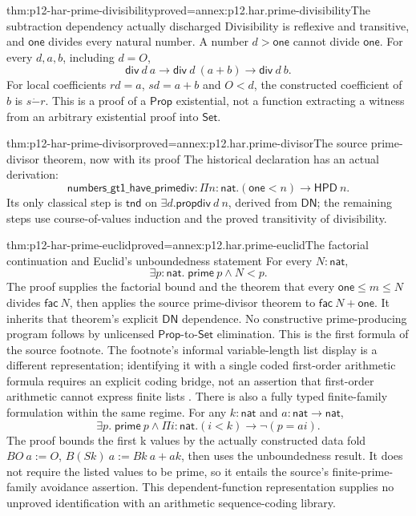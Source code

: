 \begin{hblemma}{thm:p12-har-prime-divisibility}{proved=annex:p12.har.prime-divisibility}{The subtraction dependency actually discharged}
Divisibility is reflexive and transitive, and \(\mathsf{one}\) divides
every natural number. A number \(d>\mathsf{one}\) cannot divide
\(\mathsf{one}\). For every \(d,a,b\), including \(d=O\),
\[
 \mathsf{div}\ d\ a\to\mathsf{div}\ d\ (a+b)\to\mathsf{div}\ d\ b.
\]
For local coefficients \(rd=a\), \(sd=a+b\) and \(O<d\), the
constructed coefficient of \(b\) is \(s\mathbin{\dot{-}}r\).
This is a proof of a \(\mathsf{Prop}\) existential, not a function
extracting a witness from an arbitrary existential proof into
\(\mathsf{Set}\).
\end{hblemma}

\begin{hbtheorem}{thm:p12-har-prime-divisor}{proved=annex:p12.har.prime-divisor}{The source prime-divisor theorem, now with its proof}
The historical declaration has an actual derivation:
\[
 \mathsf{numbers\_gt1\_have\_primediv}:\Pi n:\mathsf{nat}.
             (\mathsf{one}<n)\to\mathsf{HPD}\ n.
\]
Its only classical step is \(\mathsf{tnd}\) on
\(\exists d.\mathsf{propdiv}\ d\ n\), derived from
\(\mathsf{DN}\); the remaining steps use course-of-values induction
and the proved transitivity of divisibility.
\end{hbtheorem}

\begin{hbtheorem}{thm:p12-har-prime-euclid}{proved=annex:p12.har.prime-euclid}{The factorial continuation and Euclid's unboundedness statement}
For every \(N:\mathsf{nat}\),
\[
 \exists p:\mathsf{nat}.\;\mathsf{prime}\ p\wedge N<p.
\]
The proof supplies the factorial bound and the theorem that every
\(\mathsf{one}\le m\le N\) divides \(\mathsf{fac}\ N\), then
applies the source prime-divisor theorem to \(\mathsf{fac}\ N+\mathsf{one}\).
It inherits that theorem's explicit \(\mathsf{DN}\) dependence.
No constructive prime-producing program follows by unlicensed
\(\mathsf{Prop}\)-to-\(\mathsf{Set}\) elimination. This is the first
formula of the source footnote. The footnote's informal variable-length
list display is a different representation; identifying it with a single
coded first-order arithmetic formula requires an explicit coding bridge,
not an assertion that first-order arithmetic cannot express finite lists
\cite[p.~1215, note~4; p.~1220]{BarendregtGeuvers2001}.
There is also a fully typed finite-family formulation within the same
regime. For any \(k:\mathsf{nat}\) and \(a:\mathsf{nat}\to\mathsf{nat}\),
\[
 \exists p.\;\mathsf{prime}\ p\wedge
           \Pi i:\mathsf{nat}.(i<k)\to\neg(p=a i).
\]
The proof bounds the first k values by the actually constructed data
fold \(B O\ a:=O\), \(B(S k)\ a:=B k\ a+a k\), then uses the
unboundedness result. It does not require the listed values to be prime,
so it entails the source's finite-prime-family avoidance assertion.
This dependent-function representation supplies no unproved
identification with an arithmetic sequence-coding library.
\end{hbtheorem}
